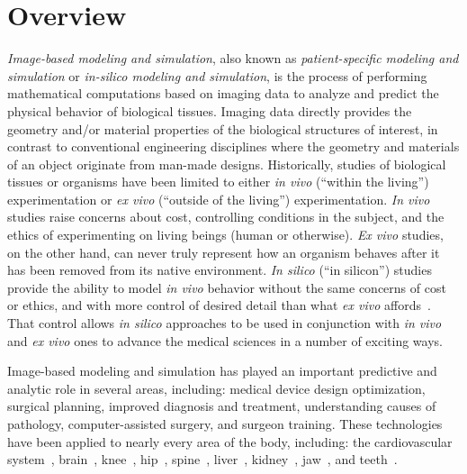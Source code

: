 \chapter{Overview}
\textit{Image-based modeling and simulation}, also known as \textit{patient-specific modeling and simulation} or \textit{in-silico modeling and simulation}, is the process of performing mathematical computations based on imaging data to analyze and predict the physical behavior of biological tissues. Imaging data directly provides the geometry and/or material properties of the biological structures of interest, in contrast to conventional engineering disciplines where the geometry and materials of an object originate from man-made designs. Historically, studies of biological tissues or organisms have been limited to either \textit{in vivo} (``within the living'') experimentation or \textit{ex vivo} (``outside of the living'') experimentation. \textit{In vivo} studies raise concerns about cost, controlling conditions in the subject, and the ethics of experimenting on living beings (human or otherwise). \textit{Ex vivo} studies, on the other hand, can never truly represent how an organism behaves after it has been removed from its native environment. \textit{In silico} (``in silicon'') studies provide the ability to model \textit{in vivo} behavior without the same concerns of cost or ethics, and with more control of desired detail than what \textit{ex vivo} affords~\cite{colquitt_2011}. That control allows \textit{in silico} approaches to be used in conjunction with \textit{in vivo} and \textit{ex vivo} ones to advance the medical sciences in a number of exciting ways.


Image-based modeling and simulation has played an important predictive and analytic role in several areas, including:  medical device design optimization,  surgical planning, improved diagnosis and treatment, understanding causes of pathology, computer-assisted surgery, and surgeon training. These technologies have been applied to nearly every area of the body, including: the cardiovascular system~\cite{min_2015, updegrove_2016}, brain~\cite{weickenmeier_2016, behnia_2008}, knee~\cite{erdemir_2015, donahue_2002}, hip~\cite{anderson_2008, el'sheikh_2003}, spine~\cite{malandrino_2014, dumas_2005}, liver~\cite{shi_2008, schwen_2014}, kidney~\cite{eloot_2002, snedeker_2005}, jaw~\cite{idrus_2017, narra_2014}, and teeth~\cite{frisardi_2011, geng_2001}. 

